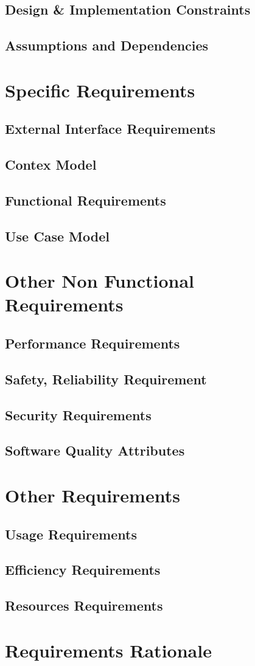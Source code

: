 \documentclass{report}
\begin{document}
	\section{Design \& Implementation Constraints}
	\section{Assumptions and Dependencies}
	\chapter{Specific Requirements}
	\section{External Interface Requirements}
	\section{Contex Model}
	\section{Functional Requirements}
	\section{Use Case Model}
	\chapter{Other Non Functional Requirements}
	\section{Performance Requirements}
	\section{Safety, Reliability Requirement}
	\section{Security Requirements}
	\section{Software Quality Attributes}
	\chapter{Other Requirements}
	\section{Usage Requirements}
	\section{Efficiency Requirements}
	\section{Resources Requirements}
	\chapter{Requirements Rationale}
\end{document}
